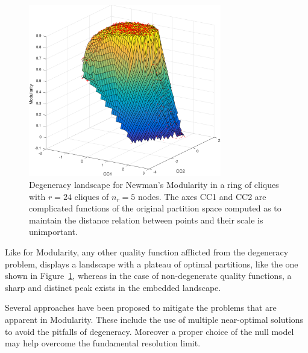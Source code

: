 \begin{figure}[htb!]
\centering
\includegraphics[width=0.75\textwidth]{images/degeneracy_modularity.pdf}
\caption{Degeneracy landscape for Newman's Modularity in a ring of cliques with $r=24$ cliques of $n_r=5$ nodes. The axes CC1 and CC2 are complicated functions of the original partition space computed as to maintain the distance relation between points and their scale is unimportant.}
\label{fig:degeneracylandscape}
\end{figure}

Like for Modularity, any other quality function afflicted from the degeneracy problem, displays a landscape with a plateau of optimal partitions, like the one shown in Figure~\ref{fig:degeneracylandscape}, whereas in the case of non-degenerate quality functions, a sharp and distinct peak exists in the embedded landscape.

Several approaches have been proposed to mitigate the problems that are apparent in Modularity. These include the use of multiple near-optimal solutions to avoid the pitfalls of degeneracy. Moreover a proper choice of the null model may help overcome the fundamental resolution limit.

